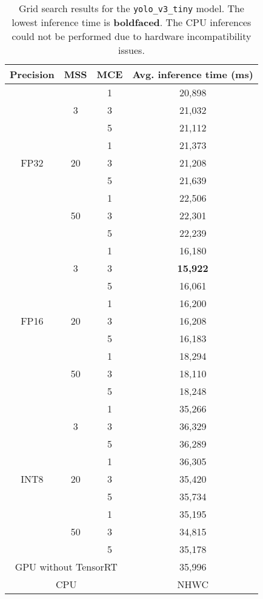 \begin{table}[]
	\begin{tabular}{|c|c|c|c|}
		\hline
		\textbf{Precision}    & \textbf{MSS}        & \textbf{MCE} & \textbf{Avg. inference time (ms)} \\ \hline
		\multirow{9}{*}{FP32} & \multirow{3}{*}{3}  & 1  & 20,898    \\ \cline{3-4} 
		&  & 3  & 21,032    \\ \cline{3-4} 
		&  & 5  & 21,112    \\ \cline{2-4} 
		& \multirow{3}{*}{20} & 1  & 21,373    \\ \cline{3-4} 
		&  & 3  & 21,208    \\ \cline{3-4} 
		&  & 5  & 21,639    \\ \cline{2-4} 
		& \multirow{3}{*}{50} & 1  & 22,506    \\ \cline{3-4} 
		&  & 3  & 22,301    \\ \cline{3-4} 
		&  & 5  & 22,239    \\ \hline
		\multirow{9}{*}{FP16} & \multirow{3}{*}{3}  & 1  & 16,180    \\ \cline{3-4} 
		&  & 3  & \textbf{15,922  }  \\ \cline{3-4} 
		&  & 5  & 16,061    \\ \cline{2-4} 
		& \multirow{3}{*}{20} & 1  & 16,200    \\ \cline{3-4} 
		&  & 3  & 16,208    \\ \cline{3-4} 
		&  & 5  & 16,183    \\ \cline{2-4} 
		& \multirow{3}{*}{50} & 1  & 18,294    \\ \cline{3-4} 
		&  & 3  & 18,110    \\ \cline{3-4} 
		&  & 5  & 18,248    \\ \hline
		\multirow{9}{*}{INT8} & \multirow{3}{*}{3}  & 1  & 35,266    \\ \cline{3-4} 
		&  & 3  & 36,329    \\ \cline{3-4} 
		&  & 5  & 36,289    \\ \cline{2-4} 
		& \multirow{3}{*}{20} & 1  & 36,305    \\ \cline{3-4} 
		&  & 3  & 35,420    \\ \cline{3-4} 
		&  & 5  & 35,734    \\ \cline{2-4} 
		& \multirow{3}{*}{50} & 1  & 35,195    \\ \cline{3-4} 
		&  & 3  & 34,815    \\ \cline{3-4} 
		&  & 5  & 35,178    \\ \hline
		\multicolumn{3}{|c|}{GPU without TensorRT}       & 35,996    \\ \hline
		\multicolumn{3}{|c|}{CPU}          & NHWC      \\ \hline
	\end{tabular}
	\caption{Grid search results for the \texttt{yolo\_v3\_tiny} model. The lowest inference time is \textbf{boldfaced}. The CPU inferences could not be performed due to hardware incompatibility issues.}
	\label{tab:3_yolo_trt_results}
\end{table}

